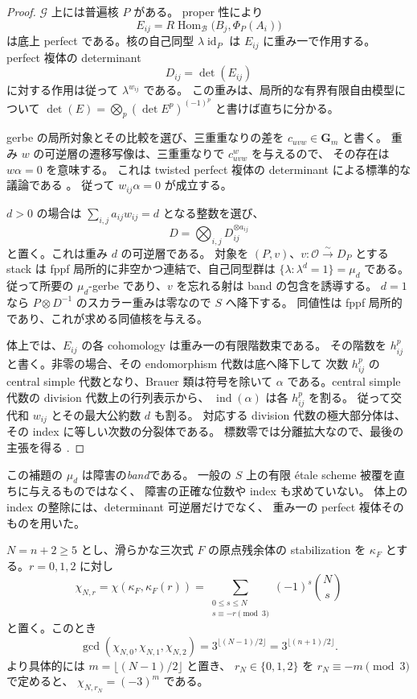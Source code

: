 \begin{proof}
$\mathcal G$ 上には普遍核 $P$ がある。
proper 性により
\[
 E_{ij}=R\operatorname{Hom}_{\mathcal B}
       \bigl(B_j,\Phi_P(A_i)\bigr)
\]
は底上 perfect である。核の自己同型
$\lambda\operatorname{id}_P$ は $E_{ij}$ に重み一で作用する。
perfect 複体の determinant
\cite[\S1]{NFMKnudsenMumfordDet}
\[
 D_{ij}=\det(E_{ij})
\]
に対する作用は従って $\lambda^{w_{ij}}$ である。
この重みは、局所的な有界有限自由模型について
$\det(E)=\bigotimes_p(\det E^p)^{(-1)^p}$ と書けば直ちに分かる。

gerbe の局所対象とその比較を選び、三重重なりの差を
$c_{uvw}\in\mathbf G_m$ と書く。
重み $w$ の可逆層の遷移写像は、三重重なりで $c_{uvw}^w$ を与えるので、
その存在は $w\alpha=0$ を意味する。
これは twisted perfect 複体の determinant による標準的な議論である
\cite[\S\S2.2.4--2.2.5]{NFMLieblichTwisted}。
従って $w_{ij}\alpha=0$ が成立する。

$d>0$ の場合は $\sum_{i,j}a_{ij}w_{ij}=d$ となる整数を選び、
\[
 D=\bigotimes_{i,j}D_{ij}^{\otimes a_{ij}}
\]
と置く。これは重み $d$ の可逆層である。
対象を $(P,v)$、$v:\mathcal O\xrightarrow{\sim}D_P$ とする stack は
fppf 局所的に非空かつ連結で、自己同型群は
$\{\lambda:\lambda^d=1\}=\mu_d$ である。
従って所要の $\mu_d$-gerbe であり、$v$ を忘れる射は band の包含を誘導する。
$d=1$ なら $P\otimes D^{-1}$ のスカラー重みは零なので $S$ へ降下する。
同値性は fppf 局所的であり、これが求める同値核を与える。

体上では、$E_{ij}$ の各 cohomology は重み一の有限階数束である。
その階数を $h_{ij}^p$ と書く。非零の場合、その endomorphism 代数は底へ降下して
次数 $h_{ij}^p$ の central simple 代数となり、Brauer 類は符号を除いて
$\alpha$ である。central simple 代数の division 代数上の行列表示から、
$\operatorname{ind}(\alpha)$ は各 $h_{ij}^p$ を割る。
従って交代和 $w_{ij}$ とその最大公約数 $d$ も割る。
対応する division 代数の極大部分体は、その index に等しい次数の分裂体である。
標数零では分離拡大なので、最後の主張を得る
\cite[Lemmas~11.7.4, 11.8.3--11.8.4]{NFMStacksSplitting}.
\end{proof}

この補題の $\mu_d$ は障害の\emph{band}である。
一般の $S$ 上の有限 étale scheme 被覆を直ちに与えるものではなく、
障害の正確な位数や index も求めていない。
体上の index の整除には、determinant 可逆層だけでなく、
重み一の perfect 複体そのものを用いた。

\begin{lemma}
\label{lem:nfm-cubic-euler-gcd}
$N=n+2\ge5$ とし、滑らかな三次式 $F$ の原点残余体の stabilization を
$\kappa_F$ とする。$r=0,1,2$ に対し
\[
 \chi_{N,r}=\chi(\kappa_F,\kappa_F(r))
   =\sum_{\substack{0\le s\le N\\s\equiv-r\pmod3}}
                  (-1)^s\binom Ns
\]
と置く。このとき
\[
 \gcd(\chi_{N,0},\chi_{N,1},\chi_{N,2})
     =3^{\lfloor(N-1)/2\rfloor}
     =3^{\lfloor(n+1)/2\rfloor}.
\]
より具体的には $m=\lfloor(N-1)/2\rfloor$ と置き、
$r_N\in\{0,1,2\}$ を $r_N\equiv-m\pmod3$ で定めると、
$\chi_{N,r_N}=(-3)^m$ である。
\end{lemma}

